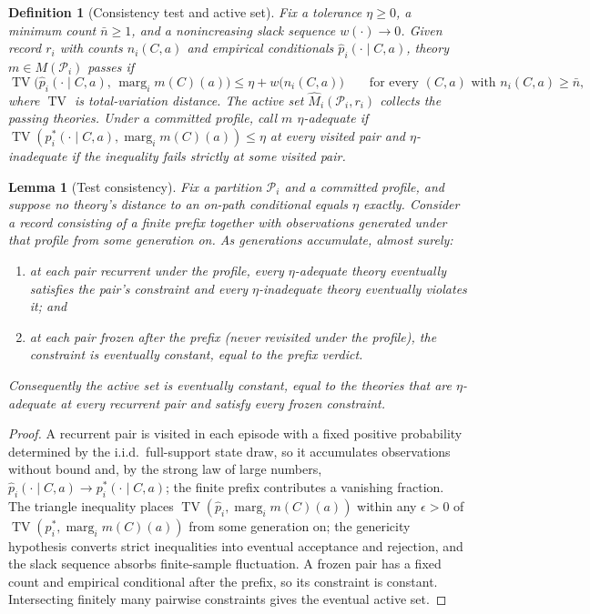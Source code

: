 \documentclass[11pt]{article}
\newtheorem{definition}[assumption]{Definition}
\newtheorem{lemma}[assumption]{Lemma}
\theoremstyle{definition}
\newcommand{\TV}{\operatorname{TV}}
\newcommand{\marg}[1]{\operatorname{marg}_{#1}}
\begin{document}
\begin{definition}[Consistency test and active set]
\label{def:test}
Fix a tolerance $\eta\geq0$, a minimum count $\bar n\geq1$, and a
nonincreasing slack sequence $w(\cdot)\to0$.  Given record $r_i$ with counts
$n_i(C,a)$ and empirical conditionals $\hat p_i(\cdot\mid C,a)$, theory
$m\in M(\mathcal P_i)$ \emph{passes} if
\begin{equation}
\TV\bigl(\hat p_i(\cdot\mid C,a),\,\marg{i}m(C)(a)\bigr)
\leq
\eta+w\bigl(n_i(C,a)\bigr)
\qquad
\text{for every }(C,a)\text{ with }n_i(C,a)\geq\bar n,
\label{eq:test}
\end{equation}
where $\TV$ is total-variation distance.  The \emph{active set}
$\widehat M_i(\mathcal P_i,r_i)$ collects the passing theories.  Under a
committed profile, call $m$ \emph{$\eta$-adequate} if
$\TV(p_i^{*}(\cdot\mid C,a),\marg{i}m(C)(a))\leq\eta$ at every visited pair
and \emph{$\eta$-inadequate} if the inequality fails strictly at some visited
pair.
\end{definition}

\begin{lemma}[Test consistency]
\label{lem:test-consistency}
Fix a partition $\mathcal P_i$ and a committed profile, and suppose no
theory's distance to an on-path conditional equals $\eta$ exactly.  Consider
a record consisting of a finite prefix together with observations generated
under that profile from some generation on.  As generations accumulate, almost
surely:
\begin{enumerate}[label=(\alph*)]
  \item at each pair recurrent under the profile, every $\eta$-adequate theory
  eventually satisfies the pair's constraint and every $\eta$-inadequate
  theory eventually violates it; and
  \item at each pair frozen after the prefix (never revisited under the
  profile), the constraint is eventually constant, equal to the prefix
  verdict.
\end{enumerate}
Consequently the active set is eventually constant, equal to the theories that
are $\eta$-adequate at every recurrent pair and satisfy every frozen
constraint.
\end{lemma}

\begin{proof}
A recurrent pair is visited in each episode with a fixed positive probability
determined by the i.i.d.\ full-support state draw, so it accumulates
observations without bound and, by the strong law of large numbers,
$\hat p_i(\cdot\mid C,a)\to p_i^{*}(\cdot\mid C,a)$; the finite prefix
contributes a vanishing fraction.  The triangle inequality places
$\TV(\hat p_i,\marg{i}m(C)(a))$ within any $\epsilon>0$ of
$\TV(p_i^{*},\marg{i}m(C)(a))$ from some generation on; the genericity
hypothesis converts strict inequalities into eventual acceptance and
rejection, and the slack sequence absorbs finite-sample fluctuation.  A frozen
pair has a fixed count and empirical conditional after the prefix, so its
constraint is constant.  Intersecting finitely many pairwise constraints gives
the eventual active set.
\end{proof}
\end{document}
